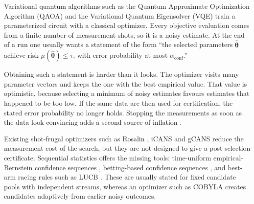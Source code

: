 \documentclass[a4paper,onecolumn,unpublished]{quantumarticle}
\newcommand{\aconf}{\alpha_{\mathrm{conf}}}
\newcommand{\thhat}{\widehat{\bm{\theta}}}
\begin{document}
Variational quantum algorithms such as the Quantum Approximate Optimization Algorithm (QAOA) \cite{farhi2014} and the Variational Quantum Eigensolver (VQE) \cite{cerezo2021} train a parameterized circuit with a classical optimizer. Every objective evaluation comes from a finite number of measurement shots, so it is a noisy estimate. At the end of a run one usually wants a statement of the form ``the selected parameters $\thhat$ achieve risk $\mu(\thhat) \le \tau$, with error probability at most $\aconf$.''

Obtaining such a statement is harder than it looks. The optimizer visits many parameter vectors and keeps the one with the best empirical value. That value is optimistic, because selecting a minimum of noisy estimates favours estimates that happened to be too low. If the same data are then used for certification, the stated error probability no longer holds. Stopping the measurements as soon as the data look convincing adds a second source of inflation \cite{dwork2015,ramdas2023}.

Existing shot-frugal optimizers such as Rosalin \cite{arrasmith2020}, iCANS \cite{kuebler2020} and gCANS \cite{gu2021} reduce the measurement cost of the search, but they are not designed to give a post-selection certificate. Sequential statistics offers the missing tools: time-uniform empirical-Bernstein confidence sequences \cite{howard2021}, betting-based confidence sequences \cite{waudby2024}, and best-arm racing rules such as LUCB \cite{kalyanakrishnan2012}. These are usually stated for fixed candidate pools with independent streams, whereas an optimizer such as COBYLA \cite{powell1994} creates candidates adaptively from earlier noisy outcomes.
\end{document}
